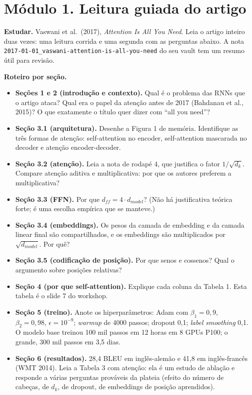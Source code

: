 \documentclass[
  11pt,
]{article}
\providecommand{\tightlist}{%
  \setlength{\itemsep}{0pt}\setlength{\parskip}{0pt}}
\begin{document}
\section{Módulo 1. Leitura guiada do
artigo}\label{muxf3dulo-1.-leitura-guiada-do-artigo}

\textbf{Estudar.} Vaswani et al.~(2017), \emph{Attention Is All You
Need}. Leia o artigo inteiro duas vezes: uma leitura corrida e uma
segunda com as perguntas abaixo. A nota
\texttt{2017-01-01\_vaswani-attention-is-all-you-need} do seu vault tem
um resumo útil para revisão.

\textbf{Roteiro por seção.}

\begin{itemize}
\tightlist
\item
  \textbf{Seções 1 e 2 (introdução e contexto).} Qual é o problema das
  RNNs que o artigo ataca? Qual era o papel da atenção antes de 2017
  (Bahdanau et al., 2015)? O que exatamente o título quer dizer com
  ``all you need''?
\item
  \textbf{Seção 3.1 (arquitetura).} Desenhe a Figura 1 de memória.
  Identifique as três formas de atenção: self-attention no encoder,
  self-attention mascarada no decoder e atenção encoder-decoder.
\item
  \textbf{Seção 3.2 (atenção).} Leia a nota de rodapé 4, que justifica o
  fator \(1/\sqrt{d_k}\). Compare atenção aditiva e multiplicativa: por
  que os autores preferem a multiplicativa?
\item
  \textbf{Seção 3.3 (FFN).} Por que \(d_{ff} = 4 \cdot d_{model}\)? (Não
  há justificativa teórica forte; é uma escolha empírica que se
  manteve.)
\item
  \textbf{Seção 3.4 (embeddings).} Os pesos da camada de embedding e da
  camada linear final são compartilhados, e os embeddings são
  multiplicados por \(\sqrt{d_{model}}\). Por quê?
\item
  \textbf{Seção 3.5 (codificação de posição).} Por que senos e cossenos?
  Qual o argumento sobre posições relativas?
\item
  \textbf{Seção 4 (por que self-attention).} Explique cada coluna da
  Tabela 1. Esta tabela é o slide 7 do workshop.
\item
  \textbf{Seção 5 (treino).} Anote os hiperparâmetros: Adam com
  \(\beta_1 = 0{,}9\), \(\beta_2 = 0{,}98\), \(\epsilon = 10^{-9}\);
  \emph{warmup} de 4000 passos; dropout 0,1; \emph{label smoothing} 0,1.
  O modelo base treinou 100 mil passos em 12 horas em 8 GPUs P100; o
  grande, 300 mil passos em 3,5 dias.
\item
  \textbf{Seção 6 (resultados).} 28,4 BLEU em inglês-alemão e 41,8 em
  inglês-francês (WMT 2014). Leia a Tabela 3 com atenção: ela é um
  estudo de ablação e responde a várias perguntas prováveis da plateia
  (efeito do número de cabeças, de \(d_k\), de dropout, de embeddings de
  posição aprendidos).
\end{itemize}
\end{document}
